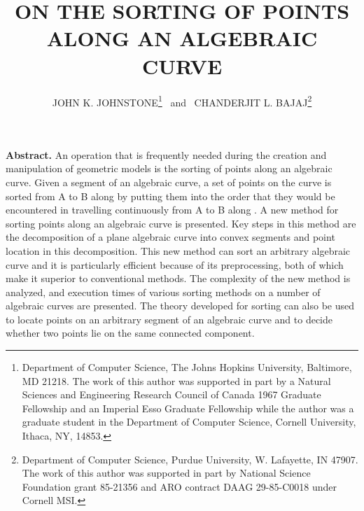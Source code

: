 \newif\ifFull
\Fulltrue
{} 
%

%
%
\DoubleSpace
\setlength{\oddsidemargin}{0pt}
\setlength{\evensidemargin}{0pt}
\setlength{\headsep}{0pt}
\setlength{\topmargin}{0pt}
\setlength{\textheight}{8.75in}
\setlength{\textwidth}{6.5in}
%
%
\title{ON THE SORTING OF POINTS ALONG AN ALGEBRAIC CURVE}
\author{
JOHN K. JOHNSTONE\thanks{Department of Computer Science, The Johns Hopkins University, 
Baltimore, MD 21218.
The work of this author was supported in part by a Natural Sciences and Engineering
Research Council of Canada 1967 Graduate 
Fellowship and an Imperial Esso Graduate Fellowship while the author was a graduate
student in the Department of Computer Science, Cornell University, Ithaca, NY, 14853.}
\ and \ 
CHANDERJIT L. BAJAJ\thanks{Department of Computer Science, Purdue University, 
W. Lafayette, IN  47907.
The work of this author was supported in part by National Science Foundation grant
85-21356 and ARO contract DAAG 29-85-C0018 under Cornell MSI.} 
}
%

\maketitle

{\bf Abstract.}
An operation that is frequently needed during the creation and manipulation of geometric 
models is the sorting of points along an algebraic curve.
Given a segment  of an algebraic curve, a set of points on the curve is sorted
from A to B along  by putting them into the order that they would be encountered 
in travelling continuously from A to B along \arc{AB}.
A new method for sorting points along an algebraic curve is presented.
Key steps in this method are the decomposition of a plane algebraic curve into convex 
segments and point location in this decomposition.
This new method can sort an arbitrary algebraic curve and it is particularly efficient 
because of its preprocessing, both of which make it superior to conventional methods.
The complexity of the new method is analyzed, and execution times of various sorting
methods on a number of algebraic curves are presented.
The theory developed for sorting can also be used to locate points on an arbitrary 
segment of an algebraic curve and to decide whether two points lie on the same connected 
component.

